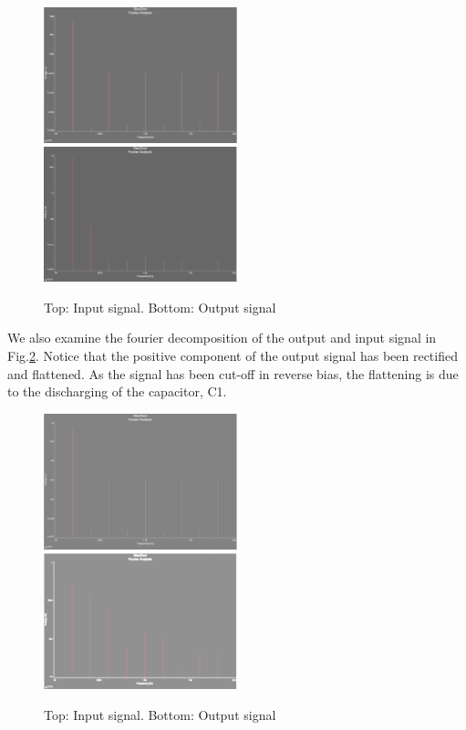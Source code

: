 \documentclass[authoryear, 12pt,5p, times]{elsarticle}
\begin{document}
\begin{figure}[h!]
\center
\includegraphics[width=0.5\textwidth]{figure/V_in_2}
\includegraphics[width=0.5\textwidth]{figure/V_out_2}
\caption{ Top: Input signal. Bottom: Output signal}
\label{fourier1}
\end{figure}
\par We also examine the fourier decomposition of the output and input signal in Fig.\ref{fourier2}. Notice that the  positive component of the output signal has been rectified and flattened. As the signal has been cut-off in reverse bias, the flattening is due to the discharging of the capacitor, C1.  
\begin{figure}[h!]
\center
\includegraphics[width=0.5\textwidth]{figure/V_in_Part3or2}
\includegraphics[width=0.5\textwidth]{figure/V_out_Part3actually2}
\caption{Top: Input signal. Bottom: Output signal}
\label{fourier2}
\end{figure}
\end{document}

